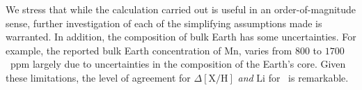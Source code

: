 \documentclass[12pt,letterpaper,margin=1in]{article}
\newcommand*\elem[1]{\ensuremath{\mathrm{#1}}}
\newcommand*\elemH[1]{\ensuremath{[\mathrm{#1}/\elem{H}]}}
\newcommand{\bizarreone}{\text{Kronos}}
\begin{document}
We stress that while the calculation carried out is useful in
an order-of-magnitude sense, further investigation of each of the simplifying
assumptions made is warranted.
In addition, the composition of bulk Earth has some uncertainties.
For example, the reported bulk Earth concentration of \elem{Mn}, varies from
$800$ to $1700$~ppm\cite{1998psc..book.....L,mcdonough2001composition,2003TrGeo...2..547M}
largely due to uncertainties in the composition of the Earth's core.
Given these limitations, the level of agreement for $\Delta\elemH{X}$ {\it and}
\elem{Li} for \bizarreone\ is remarkable.

%
\end{document}

